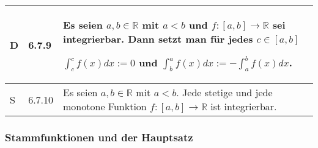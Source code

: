 \begin{longtable}{p{0.75cm} p{1cm} p{16cm}}
        \midrule
        D   & 6.7.9 &   Es seien $a, b \in \mathbb{R}$ mit $a < b$ und $f: [a,b] \rightarrow \mathbb{R}$ sei integrierbar. Dann setzt man für jedes
                        $ c \in [a,b]$ \hfill \break
                        \centerline{$ \int_c^c f(x)dx := 0$ und $\int_b^a f(x) dx := - \int_a^b f(x) dx$.} \\
        \midrule
        S   & 6.7.10&   Es seien $a, b \in \mathbb{R}$ mit $a<b$. Jede stetige und jede monotone Funktion $f : [a,b] \rightarrow \mathbb{R}$
                        ist integrierbar. \\ 

        \bottomrule

    \end{longtable}

\subsubsection{Stammfunktionen und der Hauptsatz}

